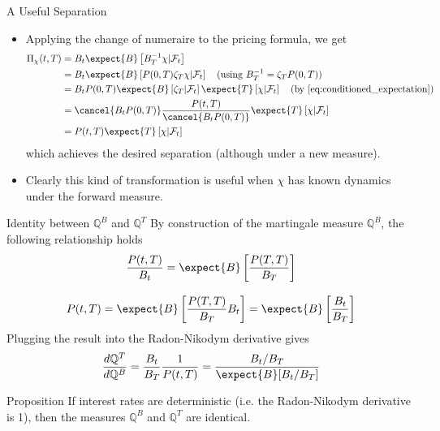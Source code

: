 \documentclass{beamer}
\begin{document}
\begin{frame}{A Useful Separation}
  \begin{itemize}
  \item<1-> Applying the change of numeraire to the pricing formula, we get
    \begin{equation*}
      \begin{aligned}
	\Pi_\chi(t,T) & = B_t\expect{B}\left[B^{-1}_T\chi|\mathcal{F}_t\right] \\
	& = B_t\expect{B}\left[P(0,T)\zeta_T\chi|\mathcal{F}_t\right]\quad\text{(using } B_T^{-1} = \zeta_TP(0,T))\\
	& = B_tP(0,T)\expect{B}\left[\zeta_T|\mathcal{F}_t\right]\expect{T}\left[\chi|\mathcal{F}_t\right]\quad\text{(by \cref{eq:conditioned_expectation})}\\
	& = \cancel{B_tP(0,T)}\frac{P(t,T)}{\cancel{B_tP(0,T)}}\expect{T}\left[\chi|\mathcal{F}_t\right] \\
	& = P(t,T)\expect{T}\left[\chi|\mathcal{F}_t\right] \\
      \end{aligned}
    \end{equation*}
    which achieves the desired separation (although under a new measure).
  \item<2-> Clearly this kind of transformation is useful when $\chi$ has known dynamics under the forward measure.
  \end{itemize}
\end{frame}

\begin{frame}{Identity between $\mathbb{Q}^B$ and $\mathbb{Q}^T$}
  By construction of the martingale measure $\mathbb{Q}^B$, the following relationship holds
  \begin{equation*}
    \begin{gathered}
      \frac{P(t,T)}{B_t}=\expect{B}\left[\frac{P(T,T)}{B_T}\right]\\[0.3cm]
      P(t,T)=\expect{B}\left[\frac{P(T,T)}{B_T}B_t\right] = \expect{B}\left[\frac{B_t}{B_T}\right]
    \end{gathered}
  \end{equation*}
	\pause
  Plugging the result into the Radon-Nikodym derivative gives
  \begin{equation*}
    \frac{d\mathbb{Q}^T}{d\mathbb{Q}^B} = \frac{B_t}{B_T}\frac{1}{P(t,T)} =\frac{B_t/B_T}{\expect{B}[B_t/B_T]}
  \end{equation*}
	\pause
  \begin{block}{Proposition}
    If interest rates are deterministic (i.e. the Radon-Nikodym derivative is 1), then the measures $\mathbb{Q}^B$ and $\mathbb{Q}^T$ are identical.
  \end{block}
\end{frame}
\end{document}
